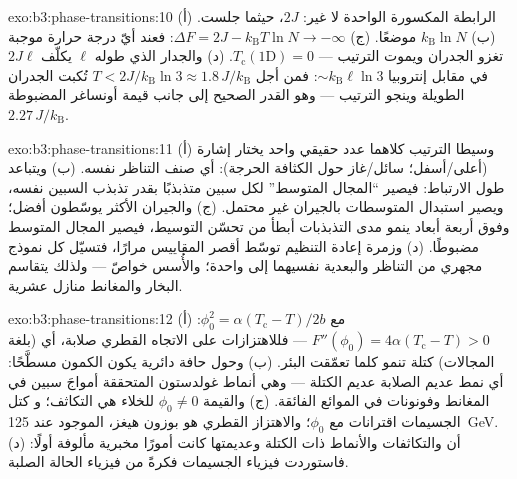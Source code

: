 \begin{solution}{exo:b3:phase-transitions:10}
(أ) الرابطة المكسورة الواحدة لا غير: $2J$، حيثما جلست. (ب)
$k_{\text{B}}\ln N$ موضعًا. (ج) $\Delta F = 2J -
k_{\text{B}}T\ln N \to -\infty$: فعند أيّ درجة حرارة موجبة
تغزو الجدران ويموت الترتيب --- $T_{\text{c}}(1\text{D}) = 0$. (د)
والجدار الذي طوله $\ell$ يكلّف $2J\ell$ في مقابل إنتروبيا
$\sim k_{\text{B}}\ell\ln3$: فمن أجل $T < 2J/k_{\text{B}}\ln3 \approx
1.8\,J/k_{\text{B}}$ تُكبت الجدران الطويلة وينجو الترتيب
--- وهو القدر الصحيح إلى جانب قيمة أونساغر المضبوطة
$2.27\,J/k_{\text{B}}$.
\end{solution}

\begin{solution}{exo:b3:phase-transitions:11}
(أ) وسيطا الترتيب كلاهما عدد حقيقي واحد يختار إشارة
(أعلى/أسفل؛ سائل/غاز حول الكثافة الحرجة): أي صنف
التناظر نفسه. (ب) ويتباعد طول الارتباط: فيصير ``المجال المتوسط''
لكل سبين متذبذبًا بقدر تذبذب السبين نفسه، ويصير
استبدال المتوسطات بالجيران غير محتمل. (ج) والجيران الأكثر
يوسّطون أفضل؛ وفوق أربعة أبعاد ينمو مدى
التذبذبات أبطأ من تحسّن التوسيط، فيصير المجال المتوسط
مضبوطًا. (د) وزمرة إعادة التنظيم توسّط أقصر المقاييس
مرارًا، فتسيّل كل نموذج مجهري من التناظر
والبعدية نفسيهما إلى  واحدة؛ والأُسس
خواصّ  --- ولذلك يتقاسم البخار والمغانط
منازل عشرية.
\end{solution}

\begin{solution}{exo:b3:phase-transitions:12}
(أ) مع $\phi_0^2 = \alpha(T_{\text{c}} - T)/2b$: $F''(\phi_0) =
4\alpha(T_{\text{c}} - T) > 0$ --- فللاهتزازات على الاتجاه
القطري صلابة، أي (بلغة المجالات) كتلة
تنمو كلما تعمّقت البئر. (ب) وحول حافة دائرية يكون
الكمون مسطَّحًا: أي نمط عديم الصلابة عديم الكتلة --- وهي
أنماط غولدستون المتحققة أمواجَ سبين في المغانط وفونونات في
الموائع الفائقة. (ج) والقيمة $\phi_0 \neq 0$ للخلاء هي التكاثف؛ و
كتل الجسيمات اقترانات مع $\phi_0$؛ والاهتزاز القطري
هو بوزون هيغز، الموجود عند \qty{125}{GeV}. (د) أن  والتكاثفات والأنماط ذات الكتلة وعديمتها كانت أمورًا مخبرية
مألوفة أولًا: فاستوردت فيزياء الجسيمات فكرةً من فيزياء الحالة الصلبة.
\end{solution}

